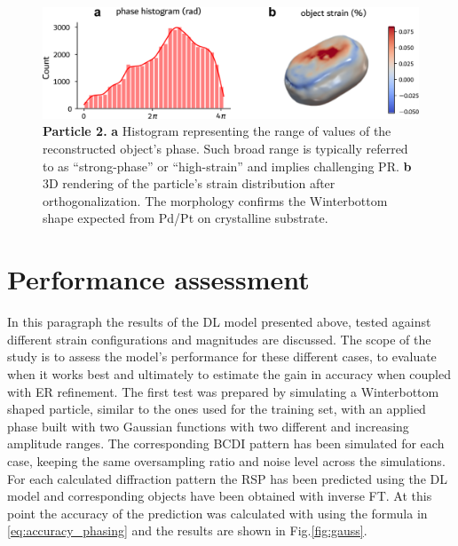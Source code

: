 \begin{figure}[H]
    \centering
    \includegraphics[width=\textwidth]{figures/Phasing/ortho_particle-3.pdf}
    \caption{\textbf{Particle 2.} \textbf{a} Histogram representing the range of values of the reconstructed object's 
    phase. Such broad range is typically referred to as ``strong-phase'' or ``high-strain'' and implies challenging PR. 
    \textbf{b} 3D rendering of the particle's strain distribution after orthogonalization. The morphology confirms the 
    Winterbottom shape expected from Pd/Pt on crystalline substrate. }
    \label{fig:obj_ortho}
\end{figure}


\newpage


\section{Performance assessment}\label{chp:performance}

In this paragraph the results of the DL model presented above, tested against different strain configurations and 
magnitudes are discussed. 
The scope of the study is to assess the model's performance for these different cases, to evaluate when it works best 
and ultimately to estimate the gain in accuracy when coupled with ER refinement. 
The first test was prepared by simulating a Winterbottom shaped particle, similar to the ones used for the training set,
with an applied phase built with two Gaussian functions with two different and increasing amplitude ranges. The 
corresponding BCDI pattern has been simulated for each case, keeping the same oversampling ratio and noise level across 
the simulations. For each calculated diffraction pattern the RSP has been predicted using the DL model and corresponding 
objects have been obtained with inverse FT. At this point the accuracy of the prediction was calculated with using the 
formula in \ref{eq:accuracy_phasing} and the results are shown in Fig.\ref{fig:gauss}. 

